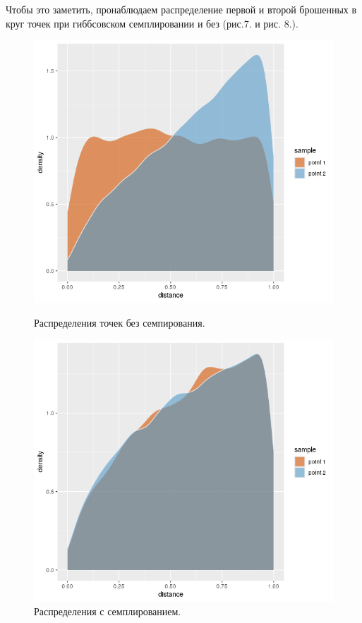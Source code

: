 \documentclass[14pt,a4paper]{article}
\begin{document}
Чтобы это заметить, пронаблюдаем распределение первой и второй брошенных в круг точек при гиббсовском семплировании и без (рис.7. и рис. 8.).
\begin{figure}[H]
   \begin{minipage}{0.52\textwidth}
     \centering
     \includegraphics[width=1\linewidth]{imgs/Rplot01.png}
     \caption{Распределения точек без семпирования.}\label{Fig:Data1}
   \end{minipage}\hfill
   \begin{minipage}{0.52\textwidth}
     \centering
     \includegraphics[width=1\linewidth]{imgs/Rplot05.png}
     \caption{Распределения с семплированием.}\label{Fig:Data2}
   \end{minipage}
\end{figure}
\end{document}
